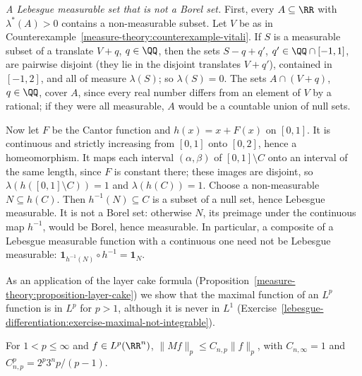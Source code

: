 \begin{counterexample}\label{lebesgue-differentiation:counterexample-non-borel}
\emph{A Lebesgue measurable set that is not a Borel set.} First, every $A \subseteq \RR$ with $\lambda^*(A) > 0$ contains a non-measurable subset. Let $V$ be as in
Counterexample~\ref{measure-theory:counterexample-vitali}. If $S$ is a measurable subset of a translate $V + q$, $q \in \QQ$, then the sets $S - q + q'$,
$q' \in \QQ \cap [-1, 1]$, are pairwise disjoint (they lie in the disjoint translates $V + q'$), contained in $[-1, 2]$, and all of measure $\lambda(S)$; so
$\lambda(S) = 0$. The sets $A \cap (V + q)$, $q \in \QQ$, cover $A$, since every real number differs from an element of $V$ by a rational; if they were all
measurable, $A$ would be a countable union of null sets.

Now let $F$ be the Cantor function and $h(x) = x + F(x)$ on $[0, 1]$. It is continuous and strictly increasing from $[0, 1]$ onto $[0, 2]$, hence a
homeomorphism. It maps each interval $(\alpha, \beta)$ of $[0, 1] \setminus C$ onto an interval of the same length, since $F$ is constant there; these images are
disjoint, so $\lambda(h([0, 1] \setminus C)) = 1$ and $\lambda(h(C)) = 1$. Choose a non-measurable $N \subseteq h(C)$. Then $h^{-1}(N) \subseteq C$ is a subset of a
null set, hence Lebesgue measurable. It is not a Borel set: otherwise $N$, its preimage under the continuous map $h^{-1}$, would be Borel, hence measurable.
In particular, a composite of a Lebesgue measurable function with a continuous one need not be Lebesgue measurable: $\mathbf{1}_{h^{-1}(N)} \circ h^{-1} = \mathbf{1}_N$.
\end{counterexample}

As an application of the layer cake formula (Proposition~\ref{measure-theory:proposition-layer-cake}) we show that the maximal function of an $L^p$ function is in $L^p$
for $p > 1$, although it is never in $L^1$ (Exercise~\ref{lebesgue-differentiation:exercise-maximal-not-integrable}).

\begin{corollary}\label{lebesgue-differentiation:corollary-maximal-lp}
For $1 < p \leq \infty$ and $f \in L^p(\RR^n)$, $\|Mf\|_p \leq C_{n,p}\|f\|_p$, with $C_{n,\infty} = 1$ and $C_{n,p}^p = 2^p3^np/(p - 1)$.
\end{corollary}

